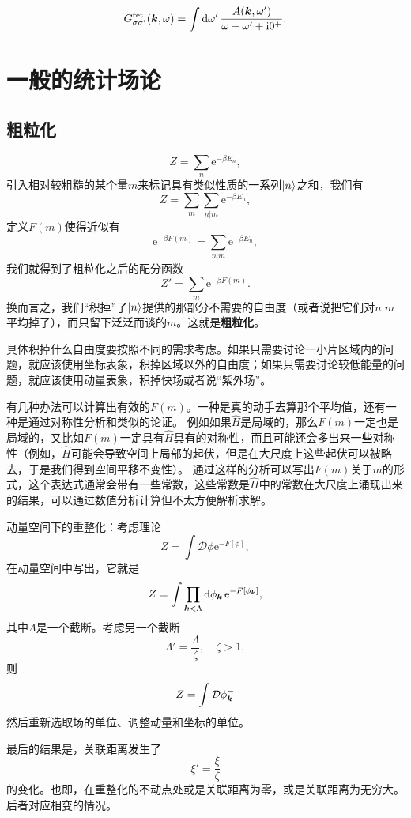 \documentclass[hyperref, UTF8, a4paper]{ctexart}
\newcommand*{\ii}{\mathrm{i}}
\newcommand*{\ee}{\mathrm{e}}
\begin{document}
\begin{equation}
    G^\text{ret}_{\sigma \sigma'}(\vb*{k}, \omega) = \int \dd{\omega'} \frac{A(\vb*{k}, \omega')}{\omega - \omega' + \ii 0^+}.
\end{equation}


\section{一般的统计场论}


\subsection{粗粒化}

\[
    Z = \sum_n \ee^{- \beta E_n},
\]
引入相对较粗糙的某个量$m$来标记具有类似性质的一系列$\ket{n}$之和，我们有
\[
    Z = \sum_m \sum_{n|m} \ee^{- \beta E_n},
\]
定义$F(m)$使得近似有
\[
    \ee^{- \beta F(m)} = \sum_{n|m} \ee^{- \beta E_n},
\]
我们就得到了粗粒化之后的配分函数
\[
    Z' = \sum_m \ee^{- \beta F(m)}.
\]
换而言之，我们“积掉”了$\ket{n}$提供的那部分不需要的自由度（或者说把它们对$n|m$平均掉了），而只留下泛泛而谈的$m$。这就是\textbf{粗粒化}。

具体积掉什么自由度要按照不同的需求考虑。如果只需要讨论一小片区域内的问题，就应该使用坐标表象，积掉区域以外的自由度；如果只需要讨论较低能量的问题，就应该使用动量表象，积掉快场或者说“紫外场”。

有几种办法可以计算出有效的$F(m)$。一种是真的动手去算那个平均值，还有一种是通过对称性分析和类似的论证。
例如如果$\hat{H}$是局域的，那么$F(m)$一定也是局域的，又比如$F(m)$一定具有$\hat{H}$具有的对称性，而且可能还会多出来一些对称性（例如，$\hat{H}$可能会导致空间上局部的起伏，但是在大尺度上这些起伏可以被略去，于是我们得到空间平移不变性）。
通过这样的分析可以写出$F(m)$关于$m$的形式，这个表达式通常会带有一些常数，这些常数是$\hat{H}$中的常数在大尺度上涌现出来的结果，可以通过数值分析计算但不太方便解析求解。

动量空间下的重整化：考虑理论
\[
    Z = \int \mathcal{D} \phi \ee^{- F[\phi]},
\]
在动量空间中写出，它就是
\[
    Z = \int \prod_{\vb*{k} < \Lambda} \dd{\phi_{\vb*{k}}} \ee^{ - F[\phi_{\vb*{k}}]},
\]
其中$\Lambda$是一个截断。考虑另一个截断
\[
    \Lambda' = \frac{\Lambda}{\zeta}, \quad \zeta > 1,
\]
则
\[
    Z = \int \mathcal{D} \phi^{-}_{\vb*{k}} 
\]
然后重新选取场的单位、调整动量和坐标的单位。

最后的结果是，关联距离发生了
\[
    \xi' = \frac{\xi}{\zeta}
\]
的变化。也即，在重整化的不动点处或是关联距离为零，或是关联距离为无穷大。后者对应相变的情况。
\end{document}
